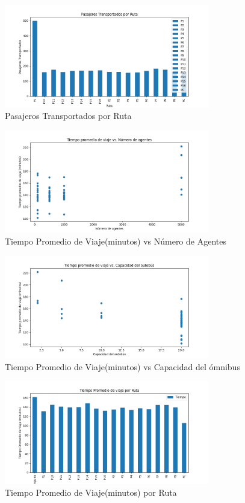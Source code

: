 \documentclass[a4paper,12pt]{article}
\begin{document}
\begin{figure}[H]
    \centering
    \includegraphics[width=0.8\textwidth]{imgs/pasajeros_ruta.png}
    \caption{Pasajeros Transportados por Ruta}
    \label{fig:3}
\end{figure}
\begin{figure}[H]
    \centering
    \includegraphics[width=0.8\textwidth]{imgs/tiempo_agentes.png}
    \caption{Tiempo Promedio de Viaje(minutos) vs N\'umero de Agentes}
    \label{fig:3}
\end{figure}
\begin{figure}[H]
    \centering
    \includegraphics[width=0.8\textwidth]{imgs/tiempo_capacidad.png}
    \caption{Tiempo Promedio de Viaje(minutos) vs Capacidad del \'omnibus}
    \label{fig:3}
\end{figure}
\begin{figure}[H]
    \centering
    \includegraphics[width=0.8\textwidth]{imgs/tiempo_ruta.png}
    \caption{Tiempo Promedio de Viaje(minutos) por Ruta}
    \label{fig:3}
\end{figure}
\end{document}
